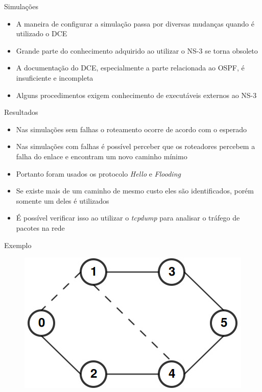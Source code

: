 \documentclass{beamer}
\newlength{\wideitemsep}
\let\olditem\item
\renewcommand{\item}{\setlength{\itemsep}{\wideitemsep}\olditem}
\begin{document}
\begin{frame}{Simulações}
\begin{itemize}
 \item A maneira de configurar a simulação passa por diversas mudanças quando é utilizado o DCE %
 \item Grande parte do conhecimento adquirido ao utilizar o NS-3 se torna obsoleto  %
 \item A documentação do DCE, especialmente a parte relacionada ao OSPF, é insuficiente e incompleta %
 \item Alguns procedimentos exigem conhecimento de executáveis externos ao NS-3 %
\end{itemize}
\end{frame}

\begin{frame}{Resultados}
\begin{itemize}
 \item Nas simulações sem falhas o roteamento ocorre de acordo com o esperado %
 \item Nas simulações com falhas é possível perceber que os roteadores percebem a falha do enlace e encontram um novo caminho mínimo %
 \item Portanto foram usados os protocolo \textit{Hello} e \textit{Flooding} %
 \item Se existe mais de um caminho de mesmo custo eles são identificados, porém somente um deles é utilizados %
 \item É possível verificar isso ao utilizar o \textit{tcpdump} para analisar o tráfego de pacotes na rede %
\end{itemize}
\end{frame}

\begin{frame}[fragile]{Exemplo}
\begin{figure}[!htb]
\centering
\includegraphics[scale=0.5]{teste1.jpg}
\end{figure}
\end{frame}
\end{document}
